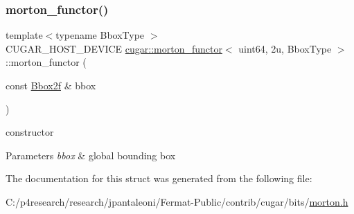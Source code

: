 \subsubsection{\texorpdfstring{morton\+\_\+functor()}{morton\_functor()}}
{\footnotesize\ttfamily template$<$typename Bbox\+Type $>$ \\
C\+U\+G\+A\+R\+\_\+\+H\+O\+S\+T\+\_\+\+D\+E\+V\+I\+CE \hyperlink{structcugar_1_1morton__functor}{cugar\+::morton\+\_\+functor}$<$ uint64, 2u, Bbox\+Type $>$\+::morton\+\_\+functor (\begin{DoxyParamCaption}\item[{const \hyperlink{structcugar_1_1_bbox}{Bbox2f} \&}]{bbox }\end{DoxyParamCaption})\hspace{0.3cm}{\ttfamily [inline]}}

constructor


\begin{DoxyParams}{Parameters}
{\em bbox} & global bounding box \\
\hline
\end{DoxyParams}


The documentation for this struct was generated from the following file\+:\begin{DoxyCompactItemize}
\item 
C\+:/p4research/research/jpantaleoni/\+Fermat-\/\+Public/contrib/cugar/bits/\hyperlink{morton_8h}{morton.\+h}\end{DoxyCompactItemize}
